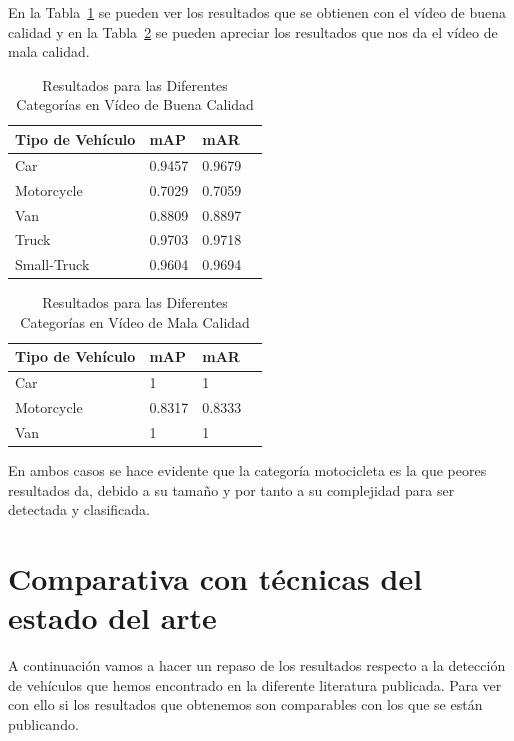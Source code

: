 En la Tabla~\ref{resultados_categoria_video_buena_calidad} se pueden ver los resultados que se obtienen con el vídeo de buena calidad y en la Tabla~\ref{resultados_categoria_video_mala_calidad} se pueden apreciar los resultados que nos da el vídeo de mala calidad.

\begin{table}[H] 
\begin{center}
\begin{tabular}{|l|l|l|l|}
\hline
Tipo de Vehículo & mAP & mAR  \\ 
\hline \hline
Car & 0.9457 & 0.9679 \\ \hline
Motorcycle & 0.7029 & 0.7059 \\ \hline
Van & 0.8809 & 0.8897\\ \hline
Truck & 0.9703 & 0.9718\\ \hline
Small-Truck & 0.9604 & 0.9694\\ \hline
\end{tabular}
\caption{Resultados para las Diferentes Categorías en Vídeo de Buena Calidad}
\label{resultados_categoria_video_buena_calidad}
\end{center}
\end{table}

\begin{table}[H] 
\begin{center}
\begin{tabular}{|l|l|l|l|}
\hline
Tipo de Vehículo & mAP & mAR  \\ 
\hline \hline
Car & 1 & 1 \\ \hline
Motorcycle & 0.8317 & 0.8333 \\ \hline
Van & 1 & 1 \\ \hline
\end{tabular}
\caption{Resultados para las Diferentes Categorías en Vídeo de Mala Calidad}
\label{resultados_categoria_video_mala_calidad}
\end{center}
\end{table}

En ambos casos se hace evidente que la categoría motocicleta es la que peores resultados da, debido a su tamaño y por tanto a su complejidad para ser detectada y clasificada.


\section{Comparativa con técnicas del estado del arte}

A continuación vamos a hacer un repaso de los resultados respecto a la detección de vehículos que hemos encontrado en la diferente literatura publicada. Para ver con ello si los resultados que obtenemos son comparables con los que se están publicando.

